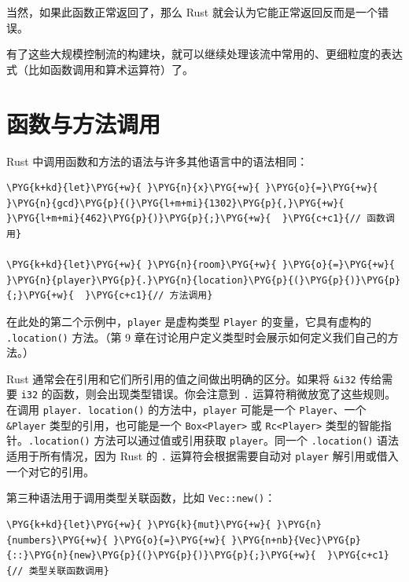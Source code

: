 当然，如果此函数正常返回了，那么 Rust 就会认为它能正常返回反而是一个错误。

有了这些大规模控制流的构建块，就可以继续处理该流中常用的、更细粒度的表达式（比如函数调用和算术运算符）了。

\section{函数与方法调用}

Rust 中调用函数和方法的语法与许多其他语言中的语法相同：

\begin{Verbatim}[commandchars=\\\{\},breaklines=true,breakanywhere=true,fontsize=\codefont,xleftmargin=17bp]
\PYG{k+kd}{let}\PYG{+w}{ }\PYG{n}{x}\PYG{+w}{ }\PYG{o}{=}\PYG{+w}{ }\PYG{n}{gcd}\PYG{p}{(}\PYG{l+m+mi}{1302}\PYG{p}{,}\PYG{+w}{ }\PYG{l+m+mi}{462}\PYG{p}{)}\PYG{p}{;}\PYG{+w}{  }\PYG{c+c1}{// 函数调用}

\PYG{k+kd}{let}\PYG{+w}{ }\PYG{n}{room}\PYG{+w}{ }\PYG{o}{=}\PYG{+w}{ }\PYG{n}{player}\PYG{p}{.}\PYG{n}{location}\PYG{p}{(}\PYG{p}{)}\PYG{p}{;}\PYG{+w}{  }\PYG{c+c1}{// 方法调用}
\end{Verbatim}

在此处的第二个示例中，\texttt{player} 是虚构类型 \texttt{Player} 的变量，它具有虚构的 \texttt{.location()} 方法。（第 9 章在讨论用户定义类型时会展示如何定义我们自己的方法。）

Rust 通常会在引用和它们所引用的值之间做出明确的区分。如果将 \texttt{\&i32} 传给需要 \texttt{i32} 的函数，则会出现类型错误。你会注意到 \texttt{.} 运算符稍微放宽了这些规则。在调用 \texttt{player. location()} 的方法中，\texttt{player} 可能是一个 \texttt{Player}、一个 \texttt{\&Player} 类型的引用，也可能是一个 \texttt{Box<Player>} 或 \texttt{Rc<Player>} 类型的智能指针。\texttt{.location()} 方法可以通过值或引用获取 \texttt{player}。同一个 \texttt{.location()} 语法适用于所有情况，因为 Rust 的 \texttt{.} 运算符会根据需要自动对 \texttt{player} 解引用或借入一个对它的引用。

第三种语法用于调用类型关联函数，比如 \texttt{Vec::new()}：

\begin{Verbatim}[commandchars=\\\{\},breaklines=true,breakanywhere=true,fontsize=\codefont,xleftmargin=17bp]
\PYG{k+kd}{let}\PYG{+w}{ }\PYG{k}{mut}\PYG{+w}{ }\PYG{n}{numbers}\PYG{+w}{ }\PYG{o}{=}\PYG{+w}{ }\PYG{n+nb}{Vec}\PYG{p}{::}\PYG{n}{new}\PYG{p}{(}\PYG{p}{)}\PYG{p}{;}\PYG{+w}{  }\PYG{c+c1}{// 类型关联函数调用}
\end{Verbatim}

